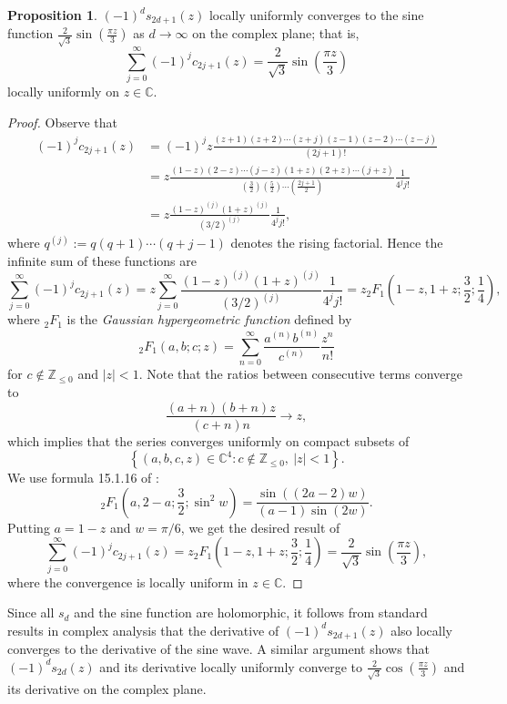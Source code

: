 \documentclass[12pt]{amsart}
\theoremstyle{definition}
\newtheorem{proposition}[theorem]{Proposition}
\begin{document}
\begin{proposition}
    $(-1)^d s_{2d+1}(z)$ locally uniformly converges to the sine function $\frac{2}{\sqrt{3}}\sin\left(\frac{\pi z}{3}\right)$ as $d\to \infty$ on the complex plane; that is,     
    $$ \sum_{j=0}^{\infty}(-1)^j c_{2j+1}(z) = \frac{2}{\sqrt{3}}\sin\left(\frac{\pi z}{3}\right)$$
    locally uniformly on $z\in \mathbb{C}$.
    \label{lem:odd_sd_unifcvg}
\end{proposition}
\begin{proof}
    Observe that
		\begin{align*}
			(-1)^j c_{2j+1}(z) 
			&= (-1)^j z \frac{(z+1)(z+2)\cdots(z+j)(z-1)(z-2)\cdots (z-j)}{(2j+1)!} \\
			&= z \frac{(1-z)(2-z)\cdots (j-z)(1+z)(2+z)\cdots (j+z)}{(\frac{3}{2})(\frac{5}{2})\cdots(\frac{2j+1}{2})}\frac{1}{4^j j!} \\
			&= z \frac{(1-z)^{(j)}(1+z)^{(j)}}{(3/2)^{(j)}}\frac{1}{4^j j!},
		\end{align*}
		where $q^{(j)} := q(q+1)\cdots (q+j-1)$ denotes the rising factorial. Hence the infinite sum of these functions are
		$$ \sum_{j=0}^{\infty}(-1)^j c_{2j+1}(z)
		 = z\sum_{j=0}^{\infty} \frac{(1-z)^{(j)}(1+z)^{(j)}}{(3/2)^{(j)}}\frac{1}{4^j j!}
		= z{}_2F_1\left(1-z,1+z;\frac{3}{2};\frac{1}{4}\right), $$
		where ${}_2F_1$ is the \textit{Gaussian hypergeometric function} defined by
		$$ {}_2F_1(a,b;c;z) = \sum_{n=0}^{\infty}\frac{a^{(n)}b^{(n)}}{c^{(n)}}\frac{z^n}{n!} $$
		for $c\not\in \mathbb{Z}_{\leq 0}$ and $|z| < 1$. Note that the ratios between consecutive terms converge to
        $$ \frac{(a+n)(b+n)z}{(c+n)n} \to z,$$
        which implies that the series converges uniformly on compact subsets of
        $$ \left\{ (a,b,c,z)\in \mathbb{C}^4: c\not\in \mathbb{Z}_{\leq 0},\ |z|<1\right\}. $$
        We use formula 15.1.16 of \cite{Abramowitz}:
		$$ {}_2F_1\left(a,2-a;\frac{3}{2};\sin^2 w\right) = \frac{\sin( (2a-2)w)}{(a-1)\sin(2w)}. $$
		Putting $a=1-z$ and $w=\pi/6$, we get the desired result of
		$$ \sum_{j=0}^{\infty}(-1)^j c_{2j+1}(z)
		 = z{}_2F_1\left(1-z,1+z;\frac{3}{2};\frac{1}{4}\right) = \frac{2}{\sqrt{3}}\sin\left(\frac{\pi z}{3}\right), $$ 
         where the convergence is locally uniform in $z\in \mathbb{C}$.
\end{proof}

Since all $s_d$ and the sine function are holomorphic, it follows from standard results in complex analysis that the derivative of $(-1)^d s_{2d+1}(z)$ also locally converges to the derivative of the sine wave. A similar argument shows that $(-1)^d s_{2d}(z)$ and its derivative locally uniformly converge to $\frac{2}{\sqrt{3}}\cos(\frac{\pi z}{3})$ and its derivative on the complex plane.
\end{document}
